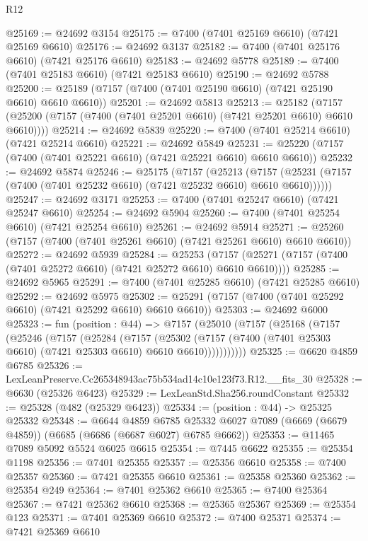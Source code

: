 \begin{lexlean}{R12}
\begin{coremodule}
@25169 := @24692 @3154
@25175 := @7400 (@7401 @25169 @6610) (@7421 @25169 @6610)
@25176 := @24692 @3137
@25182 := @7400 (@7401 @25176 @6610) (@7421 @25176 @6610)
@25183 := @24692 @5778
@25189 := @7400 (@7401 @25183 @6610) (@7421 @25183 @6610)
@25190 := @24692 @5788
@25200 := @25189 (@7157 (@7400 (@7401 @25190 @6610) (@7421 @25190 @6610) @6610 @6610))
@25201 := @24692 @5813
@25213 := @25182
    (@7157 (@25200 (@7157 (@7400 (@7401 @25201 @6610) (@7421 @25201 @6610) @6610 @6610))))
@25214 := @24692 @5839
@25220 := @7400 (@7401 @25214 @6610) (@7421 @25214 @6610)
@25221 := @24692 @5849
@25231 := @25220 (@7157 (@7400 (@7401 @25221 @6610) (@7421 @25221 @6610) @6610 @6610))
@25232 := @24692 @5874
@25246 := @25175
    (@7157
      (@25213
        (@7157 (@25231 (@7157 (@7400 (@7401 @25232 @6610) (@7421 @25232 @6610) @6610 @6610))))))
@25247 := @24692 @3171
@25253 := @7400 (@7401 @25247 @6610) (@7421 @25247 @6610)
@25254 := @24692 @5904
@25260 := @7400 (@7401 @25254 @6610) (@7421 @25254 @6610)
@25261 := @24692 @5914
@25271 := @25260 (@7157 (@7400 (@7401 @25261 @6610) (@7421 @25261 @6610) @6610 @6610))
@25272 := @24692 @5939
@25284 := @25253
    (@7157 (@25271 (@7157 (@7400 (@7401 @25272 @6610) (@7421 @25272 @6610) @6610 @6610))))
@25285 := @24692 @5965
@25291 := @7400 (@7401 @25285 @6610) (@7421 @25285 @6610)
@25292 := @24692 @5975
@25302 := @25291 (@7157 (@7400 (@7401 @25292 @6610) (@7421 @25292 @6610) @6610 @6610))
@25303 := @24692 @6000
@25323 := fun (position : @44) =>
  @7157
    (@25010
      (@7157
        (@25168
          (@7157
            (@25246
              (@7157
                (@25284
                  (@7157
                    (@25302
                      (@7157 (@7400 (@7401 @25303 @6610) (@7421 @25303 @6610) @6610 @6610)))))))))))
@25325 := @6620 @4859 @6785
@25326 := LexLeanPreserve.Cc265348943ac75b534ad14c10e123f73.R12.__fits_30
@25328 := @6630 (@25326 @6423)
@25329 := LexLeanStd.Sha256.roundConstant
@25332 := @25328 (@482 (@25329 @6423))
@25334 := (position : @44) -> @25325 @25332
@25348 := @6644
    @4859
    @6785
    @25332
    @6027
    @7089
    (@6669 (@6679 @4859))
    (@6685 (@6686 (@6687 @6027) @6785 @6662))
@25353 := @11465 @7089 @5092 @5524 @6025 @6615
@25354 := @7445 @6622
@25355 := @25354 @1198
@25356 := @7401 @25355
@25357 := @25356 @6610
@25358 := @7400 @25357
@25360 := @7421 @25355 @6610
@25361 := @25358 @25360
@25362 := @25354 @249
@25364 := @7401 @25362 @6610
@25365 := @7400 @25364
@25367 := @7421 @25362 @6610
@25368 := @25365 @25367
@25369 := @25354 @123
@25371 := @7401 @25369 @6610
@25372 := @7400 @25371
@25374 := @7421 @25369 @6610

\end{coremodule}
\end{lexlean}
